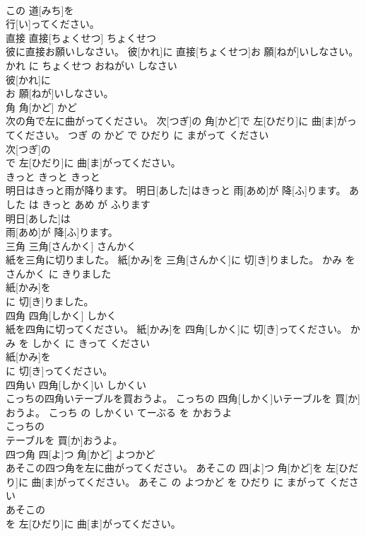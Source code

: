 \documentclass[8pt]{extreport}
\begin{document}
\begin{CJK}{UTF8}{min}
\\	この 道[みち]を
\\	行[い]ってください。		
\\	直接	直接[ちょくせつ]	ちょくせつ	
\\	彼に直接お願いしなさい。	彼[かれ]に 直接[ちょくせつ]お 願[ねが]いしなさい。	かれ に ちょくせつ おねがい しなさい	
\\	彼[かれ]に
\\	お 願[ねが]いしなさい。		
\\	角	角[かど]	かど	
\\	次の角で左に曲がってください。	次[つぎ]の 角[かど]で 左[ひだり]に 曲[ま]がってください。	つぎ の かど で ひだり に まがって ください	
\\	次[つぎ]の
\\	で 左[ひだり]に 曲[ま]がってください。		
\\	きっと	きっと	きっと	
\\	明日はきっと雨が降ります。	明日[あした]はきっと 雨[あめ]が 降[ふ]ります。	あした は きっと あめ が ふります	
\\	明日[あした]は
\\	雨[あめ]が 降[ふ]ります。		
\\	三角	三角[さんかく]	さんかく	
\\	紙を三角に切りました。	紙[かみ]を 三角[さんかく]に 切[き]りました。	かみ を さんかく に きりました	
\\	紙[かみ]を
\\	に 切[き]りました。		
\\	四角	四角[しかく]	しかく	
\\	紙を四角に切ってください。	紙[かみ]を 四角[しかく]に 切[き]ってください。	かみ を しかく に きって ください	
\\	紙[かみ]を
\\	に 切[き]ってください。		
\\	四角い	四角[しかく]い	しかくい	
\\	こっちの四角いテーブルを買おうよ。	こっちの 四角[しかく]いテーブルを 買[か]おうよ。	こっち の しかくい てーぶる を かおうよ	
\\	こっちの
\\	テーブルを 買[か]おうよ。		
\\	四つ角	四[よ]つ 角[かど]	よつかど	
\\	あそこの四つ角を左に曲がってください。	あそこの 四[よ]つ 角[かど]を 左[ひだり]に 曲[ま]がってください。	あそこ の よつかど を ひだり に まがって ください	
\\	あそこの
\\	を 左[ひだり]に 曲[ま]がってください。		

\end{CJK}
\end{document}

